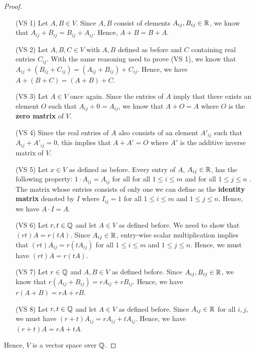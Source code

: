 \begin{proof}
\begin{enumerate}
    \item[(VS 1)] Let \( A, B \in V  \). Since \( A,B  \) consist of elements \( A_{ij}, B_{ij} \in \mathbb{R}  \), we know that \( A_{ij} + B_{ij} = B_{ij} + A_{ij}  \). Hence, \( A + B = B +  A \). 
    \item[(VS 2)] Let \( A,B, C \in V  \) with \( A,B  \) defined as before and \( C   \) containing real entries \( C_{ij}  \). With the same reasoning used to prove (VS 1), we know that \( A_{ij } + ( B_{ij } + C_{ij}  ) = (A_{ij} + B_{ij}) + C_{ij}   \). Hence, we have \( A + (B +C ) = (A+B) + C  \). 
    \item[(VS 3)] Let \( A \in V  \) once again. Since the entries of \( A  \) imply that there exists an element \( O  \) such that \( A_{ij} + 0 = A_{ij}    \), we know that \( A + O = A  \) where \( O  \) is the \textbf{zero matrix} of \( V  \).
    \item[(VS 4)] Since the real  entries of \( A  \) also consists of an element \( A'_{ij}  \) such that \( A_{ij} + A'_{ij} = 0  \), this implies that \( A + A' = O \) where \( A'  \) is the additive inverse matrix of \(  V  \).
    \item[(VS 5)] Let \( x \in V  \) as defined as before. Every entry of \( A  \), \( A_{ij} \in \mathbb{R}  \), has the following property: \( 1 \cdot A_{ij} = A_{ij}   \) for all  for all \(  1 \leq i \leq m   \) and  for all \(  1 \leq j \leq n   \) . The matrix whose entries consists of only one we can define as the \textbf{identity matrix} denoted by \(  I  \) where \( I_{ij} = 1  \) for all \(  1 \leq i \leq m   \) and \( 1 \leq j \leq n  \). Hence, we have \( A \cdot I = A  \).
    \item[(VS 6)] Let \( r,t \in \mathbb{Q}  \) and let \( A \in V  \) as defined before. We need to show that \( (rt) A = r(tA) \). Since \( A_{ij} \in \mathbb{R}  \), entry-wise scalar multiplication implies that \( (rt) A_{ij} = r(t A_{ij})  \) for all \( 1 \leq i \leq m  \) and \( 1 \leq j \leq n  \). Hence, we must have \( (rt) A = r (tA ) \).
    \item[(VS 7)] Let \( r \in \mathbb{Q}  \) and \( A, B \in V  \) as defined before. Since \( A_{ij}, B_{ij}  \in \mathbb{R}  \), we know that \( r(A_{ij} + B_{ij} ) = r A_{ij} + r B_{ij}  \). Hence, we have \( r(A + B ) = r A + r B  \).
    \item[(VS 8)] Let \( r,t \in \mathbb{Q}  \) and let \( A \in V  \) as defined before. Since \( A_{ij} \in \mathbb{R}   \) for all \( i,j \), we must have \( (r+t)A_{ij} = r A_{ij} + t A_{ij}    \). Hence, we have \( (r+t) A  = rA + tA  \).
\end{enumerate}
Hence, \( V  \) is a vector space over \( \mathbb{Q}  \).
\end{proof}

